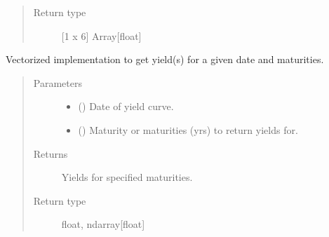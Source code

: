 \documentclass[letterpaper,10pt,english]{report}
\begin{document}
\begin{fulllineitems}
\begin{fulllineitems}
\begin{quote}
\begin{description}
\item[{Return type}] \leavevmode
{[}1 x 6{]} Array{[}float{]}

\end{description}\end{quote}

\end{fulllineitems}


\begin{fulllineitems}
\label{\detokenize{index:lgimapy.models.TreasuryCurve.get_yield}}
Vectorized implementation to get yield(s) for a
given date and maturities.
\begin{quote}\begin{description}
\item[{Parameters}] \leavevmode\begin{itemize}
\item {} 
 () \textendash{} Date of yield curve.

\item {} 
 (\sphinxstyleliteralemphasis{\sphinxupquote{, }}\sphinxstyleliteralemphasis{\sphinxupquote{{[}}}\sphinxstyleliteralemphasis{\sphinxupquote{{]}}}\sphinxstyleliteralemphasis{\sphinxupquote{}}) \textendash{} Maturity or maturities (yrs) to return yields for.

\end{itemize}

\item[{Returns}] \leavevmode
{} \textendash{} Yields for specified maturities.

\item[{Return type}] \leavevmode
float, ndarray{[}float{]}

\end{description}\end{quote}

\end{fulllineitems}


\end{fulllineitems}
\end{document}
